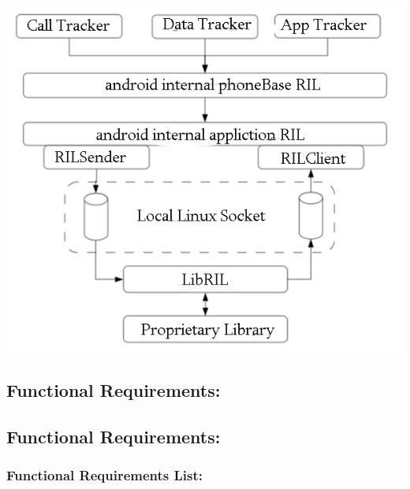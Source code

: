 \documentclass[11pt]{article}
\begin{document}
				\includegraphics[width=0.5\linewidth]{Images/software.jpg}\\[0.5cm]
						
		\subsection{Functional Requirements:}
		
		\subsection{Functional Requirements:}
		
		\subsubsection{Functional Requirements List:}
		
\end{document}
